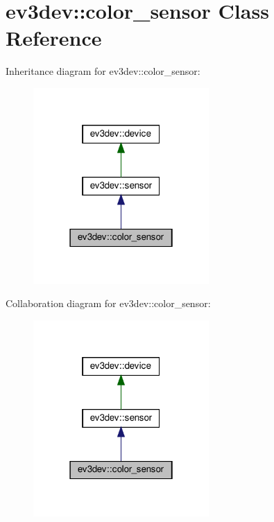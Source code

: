 \hypertarget{classev3dev_1_1color__sensor}{}\section{ev3dev\+:\+:color\+\_\+sensor Class Reference}
\label{classev3dev_1_1color__sensor}


Inheritance diagram for ev3dev\+:\+:color\+\_\+sensor\+:
\nopagebreak
\begin{figure}[H]
\begin{center}
\leavevmode
\includegraphics[width=190pt]{classev3dev_1_1color__sensor__inherit__graph}
\end{center}
\end{figure}


Collaboration diagram for ev3dev\+:\+:color\+\_\+sensor\+:
\nopagebreak
\begin{figure}[H]
\begin{center}
\leavevmode
\includegraphics[width=190pt]{classev3dev_1_1color__sensor__coll__graph}
\end{center}
\end{figure}
